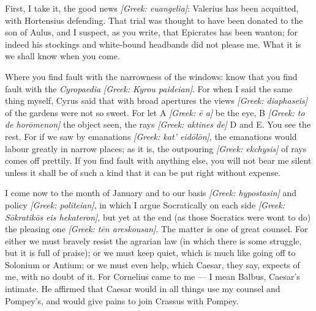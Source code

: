

 First, I take it, the good news \textit{[Greek: euangelia]}: Valerius has been acquitted, with Hortensius defending. That trial was thought to have been donated to the son of Aulus, and I suspect, as you write, that Epicrates has been wanton; for indeed his stockings and white-bound headbands did not please me. What it is we shall know when you come.

 Where you find fault with the narrowness of the windows: know that you find fault with the \textit{Cyropaedia} \textit{[Greek: Kyrou paideian]}. For when I said the same thing myself, Cyrus said that with broad apertures the views \textit{[Greek: diaphaseis]} of the gardens were not so sweet. For let A \textit{[Greek: \=e a]} be the eye, B \textit{[Greek: to de hor\=omenon]} the object seen, the rays \textit{[Greek: aktines de]} D and E. You see the rest. For if we saw by emanations \textit{[Greek: kat' eid\=ol\=on]}, the emanations would labour greatly in narrow places; as it is, the outpouring \textit{[Greek: ekchysis]} of rays comes off prettily. If you find fault with anything else, you will not bear me silent unless it shall be of such a kind that it can be put right without expense.

 I come now to the month of January and to our basis \textit{[Greek: hypostasin]} and policy \textit{[Greek: politeian]}, in which I argue Socratically on each side \textit{[Greek: S\=okratik\=os eis hekateron]}, but yet at the end (as those Socratics were wont to do) the pleasing one \textit{[Greek: t\=en areskousan]}. The matter is one of great counsel. For either we must bravely resist the agrarian law (in which there is some struggle, but it is full of praise); or we must keep quiet, which is much like going off to Solonium or Antium; or we must even help, which Caesar, they say, expects of me, with no doubt of it. For Cornelius came to me --- I mean Balbus, Caesar's intimate. He affirmed that Caesar would in all things use my counsel and Pompey's, and would give pains to join Crassus with Pompey.

